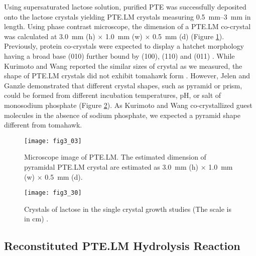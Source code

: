 \begin{refsection}
Using supersaturated lactose solution, purified PTE was successfully deposited
onto the lactose crystals yielding PTE.LM crystals measuring
\SIrange{0.5}{3}{\mm} in length. Using phase contrast microscope, the dimension
of a PTE.LM co-crystal was calculated at \SI{3.0}{\mm} (h) $\times$ \SI{1.0}{\mm}
(w) $\times$ \SI{0.5}{\mm} (d) (Figure \ref{fig:ptelm-image}). Previously, protein
co-crystals were expected to display a hatchet morphology having a broad base
(010) further bound by (100), (110) and (011) \cite{Kurimoto1999}. While Kurimoto
 \cite{Kurimoto1999} and Wang  \cite{Wang2001a}
reported the similar sizes of crystal as we measured, the shape of PTE.LM
crystals did not exhibit tomahawk form \cite{Kurimoto1999,Wong2014}. However,
Jelen and Ganzle  demonstrated that different crystal shapes, such as
pyramid or prism, could be formed from different incubation temperatures, pH,
or salt of monosodium phosphate \cite{Jelen1973a,Jelen1973,Ganzle2008} (Figure
\ref{fig:pyramid}). As Kurimoto  \cite{Kurimoto1999} and Wang
 \cite{Wang2001a} co-crystallized guest molecules in the
absence of sodium phosphate, we expected a pyramid shape different from
tomahawk.
\begin{figure}[htbp] \centering \texttt{[image: fig3\_03]} 
    \caption[Microscope image of PTE.LM. The estimated dimension of pyramidal
    PTE.LM crystal are estimated as  \SI{3.0}{\mm} (h) $\times$ \SI{1.0}{\mm}
(w) $\times$ \SI{0.5}{\mm} (d).]{Microscope image of PTE.LM. The estimated
    dimension of pyramidal PTE.LM crystal are estimated as  \SI{3.0}{\mm} (h)
    $\times$ \SI{1.0}{\mm} (w) $\times$ \SI{0.5}{\mm} (d).}
    \label{fig:ptelm-image} 
\end{figure}

\begin{figure}[htbp] \centering \texttt{[image: fig3\_30]}
    \caption[Crystals of lactose in the single crystal growth studies (The
    scale is in cm).] {Crystals of lactose in the single crystal growth studies
        (The scale is in cm) \cite{Jelen1973}.}
    \label{fig:pyramid}
\end{figure}

\subsection{Reconstituted PTE.LM Hydrolysis Reaction}


\end{refsection}
